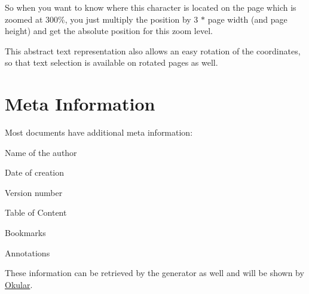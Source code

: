 So when you want to know where this character is located on the page which is zoomed at 300\%, you just multiply the position by 3 $\ast$ page width (and page height) and get the absolute position for this zoom level.

This abstract text representation also allows an easy rotation of the coordinates, so that text selection is available on rotated pages as well.\hypertarget{okular_design_okular_design_meta_information}{}\section{Meta Information}\label{okular_design_okular_design_meta_information}
Most documents have additional meta information\+:

\begin{DoxyItemize}
\item Name of the author \item Date of creation \item Version number \item Table of Content \item Bookmarks \item Annotations\end{DoxyItemize}
These information can be retrieved by the generator as well and will be shown by \hyperlink{namespaceOkular}{Okular}. 